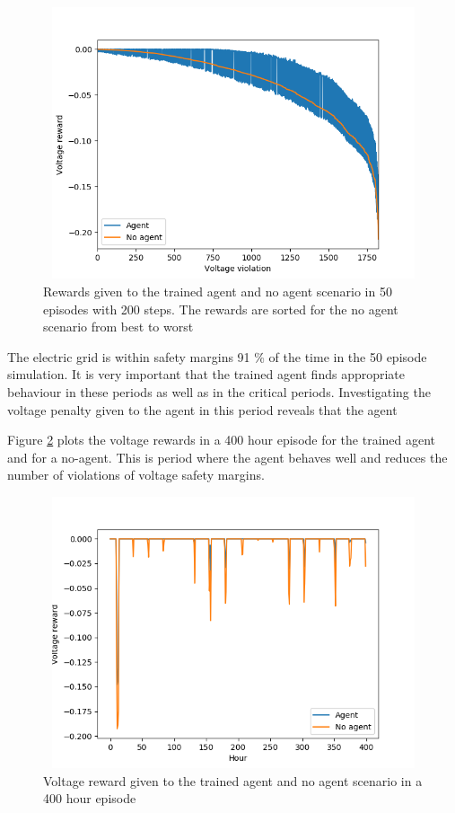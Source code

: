 \documentclass[class=book, crop=false]{standalone}
\begin{document}
\begin{figure}[ht]
    \center
\includegraphics[height=8cm, width=12cm]{figures/config1_sorted_voltage.png}
    \caption[size = 9]{Rewards given to the trained agent and no agent scenario in 50 episodes with 200 steps. The rewards are sorted for the no agent scenario from best to worst}
    \label{fig:results:config1_sorted_voltage}
\end{figure}


The electric grid is within safety margins 91 \% of the time in the 50 episode simulation. It is very important that the trained agent finds appropriate behaviour in these periods as well as in the critical periods. Investigating the voltage penalty given to the agent in this period reveals that the agent 



Figure \ref{fig:results:config1_400hour_good_voltage} plots the voltage rewards in a 400 hour episode for the trained agent and for a no-agent. This is period where the agent behaves well and reduces the number of violations of voltage safety margins. 

\begin{figure}[H]
    \center
\includegraphics[height=8cm, width=12cm]{figures/config1_400hour_good_voltage.png}
    \caption[size = 9]{Voltage reward given to the trained agent and no agent scenario in a 400 hour episode}
    \label{fig:results:config1_400hour_good_voltage}
\end{figure}
\end{document}
